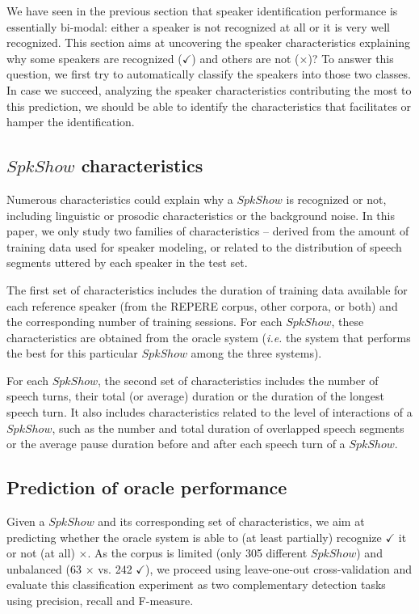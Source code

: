 We have seen in the previous section that speaker identification performance is essentially bi-modal: either a speaker is not recognized at all or it is very well recognized. This section aims at uncovering the speaker characteristics explaining why some speakers are recognized ($\checkmark$) and others are not ($\times$)? To answer this question, we first try to automatically classify the speakers into those two classes. In case we succeed, analyzing the speaker characteristics contributing the most to this prediction, we should be able to identify the characteristics that facilitates or hamper the identification.

\subsection{$SpkShow$ characteristics}

Numerous characteristics could explain why a $SpkShow$ is recognized or not, including linguistic or prosodic characteristics or the background noise. In this paper, we only study two families of characteristics -- derived from the amount of training data used for speaker modeling, or related to the distribution of speech segments uttered by each speaker in the test set. 

The first set of characteristics includes the duration of training data available for each reference speaker (from the REPERE corpus, other corpora, or both) and the corresponding number of training sessions. For each $SpkShow$, these characteristics are obtained from the oracle system (\emph{i.e.} the system that performs the best for this particular $SpkShow$ among the three systems).

For each $SpkShow$, the second set of characteristics includes the number of speech turns, their total (or average) duration or the duration of the longest speech turn. It also includes characteristics related to the level of interactions of a $SpkShow$, such as the number and total duration of overlapped speech segments or the average pause duration before and after each speech turn of a $SpkShow$.

\subsection{Prediction of oracle performance}

Given a $SpkShow$ and its corresponding set of characteristics, we aim at predicting whether the oracle system is able to (at least partially) recognize $\checkmark$ it or not (at all) $\times$. 
As the corpus is limited (only 305 different $SpkShow$) and unbalanced (63 $\times$ vs. 242 $\checkmark$), we proceed using leave-one-out cross-validation and evaluate this classification experiment as two complementary detection tasks using precision, recall and F-measure.

